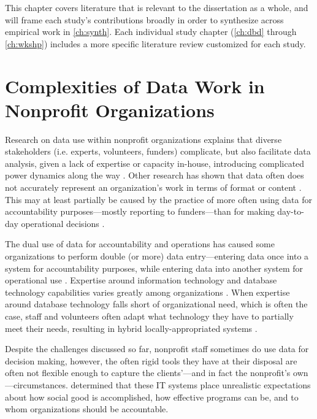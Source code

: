 This chapter covers literature that is relevant to the dissertation as a whole, and will frame each study's contributions broadly in order to synthesize across empirical work in \autoref{ch:synth}. Each individual study chapter (\autoref{ch:dbd} through \autoref{ch:wkshp}) includes a more specific literature review customized for each study.

\section{Complexities of Data Work in Nonprofit Organizations}
Research on data use within nonprofit organizations explains that diverse stakeholders (i.e. experts, volunteers, funders) complicate, but also facilitate data analysis, given a lack of expertise or capacity in-house, introducing complicated power dynamics along the way \citep{Voida2011Homebrew, Erete2016Storytelling, LeDantec2010Boundaries, Voida2017Currencies, Verma2016DrillDown}. Other research has shown that data often does not accurately represent an organization’s work in terms of format or content \citep{Verma2016DrillDown, Benjamin2012FrontOut, Benjamin2015Agency, Marshall2016Accountable}. This may at least partially be caused by the practice of more often using data for accountability purposes—mostly reporting to funders—than for making day-to-day operational decisions \citep{LeDantec2008Trenches, LeDantec2010Boundaries, Stoll2010Interorg, Voida2017Currencies}.

The dual use of data for accountability and operations has caused some organizations to perform double (or more) data entry—entering data once into a system for accountability purposes, while entering data into another system for operational use \citep{LeDantec2008Trenches}. Expertise around information technology and database technology capabilities varies greatly among organizations \citep{LeDantec2008Trenches, Stoll2010Interorg, Benjamin2018Policy}. When expertise around database technology falls short of organizational need, which is often the case, staff and volunteers often adapt what technology they have to partially meet their needs, resulting in hybrid locally-appropriated systems \citep{Voida2011Homebrew, Verma2016DrillDown, Stoll2010Interorg, Voida2017Currencies}.

Despite the challenges discussed so far, nonprofit staff sometimes do use data for decision making, however, the often rigid tools they have at their disposal are often not flexible enough to capture the clients’---and in fact the nonprofit’s own---circumstances. \citet{Harmon2017Fictions} determined that these IT systems place unrealistic expectations about how social good is accomplished, how effective programs can be, and to whom organizations should be accountable.

